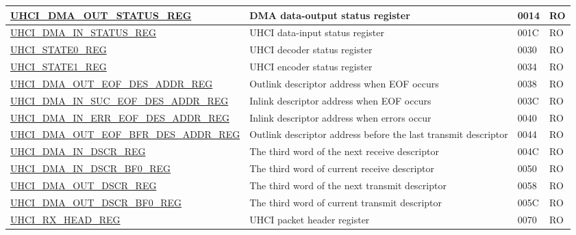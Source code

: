 \begin{longtable}{ | p{6cm} | p{7.2cm} | p{1.3cm} | p{1cm} | }
\hyperref[regdesc:UHCIDMAOUTSTATUSREG]{UHCI\_DMA\_OUT\_STATUS\_REG} & DMA data-output status register & \hexprefix{}0014 & RO \\ \hline
\hyperref[regdesc:UHCIDMAINSTATUSREG]{UHCI\_DMA\_IN\_STATUS\_REG} & UHCI data-input status register & \hexprefix{}001C & RO \\ \hline
\hyperref[regdesc:UHCISTATE0REG]{UHCI\_STATE0\_REG} & UHCI decoder status register & \hexprefix{}0030 & RO \\ \hline
\hyperref[regdesc:UHCISTATE1REG]{UHCI\_STATE1\_REG} & UHCI encoder status register & \hexprefix{}0034 & RO \\ \hline
\hyperref[regdesc:UHCIDMAOUTEOFDESADDRREG]{UHCI\_DMA\_OUT\_EOF\_DES\_ADDR\newline\_REG} & Outlink descriptor address when EOF occurs & \hexprefix{}0038 & RO \\ \hline
\hyperref[regdesc:UHCIDMAINSUCEOFDESADDRREG]{UHCI\_DMA\_IN\_SUC\_EOF\_DES\_ADDR\newline\_REG} & Inlink descriptor address when EOF occurs & \hexprefix{}003C & RO \\ \hline
\hyperref[regdesc:UHCIDMAINERREOFDESADDRREG]{UHCI\_DMA\_IN\_ERR\_EOF\_DES\_ADDR\newline\_REG} & Inlink descriptor address when errors occur & \hexprefix{}0040 & RO \\ \hline
\hyperref[regdesc:UHCIDMAOUTEOFBFRDESADDRREG]{UHCI\_DMA\_OUT\_EOF\_BFR\_DES\_ADDR\newline\_REG} & Outlink descriptor address before the last transmit descriptor & \hexprefix{}0044 & RO \\ \hline
\hyperref[regdesc:UHCIDMAINDSCRREG]{UHCI\_DMA\_IN\_DSCR\_REG} & The third word of the next receive descriptor & \hexprefix{}004C & RO \\ \hline
\hyperref[regdesc:UHCIDMAINDSCRBF0REG]{UHCI\_DMA\_IN\_DSCR\_BF0\_REG} & The third word of current receive descriptor & \hexprefix{}0050 & RO \\ \hline
\hyperref[regdesc:UHCIDMAOUTDSCRREG]{UHCI\_DMA\_OUT\_DSCR\_REG} & The third word of the next transmit descriptor & \hexprefix{}0058 & RO \\ \hline
\hyperref[regdesc:UHCIDMAOUTDSCRBF0REG]{UHCI\_DMA\_OUT\_DSCR\_BF0\_REG} & The third word of current transmit descriptor & \hexprefix{}005C & RO \\ \hline
\hyperref[regdesc:UHCIRXHEADREG]{UHCI\_RX\_HEAD\_REG} & UHCI packet header register & \hexprefix{}0070 & RO \\ \hline

\end{longtable}

